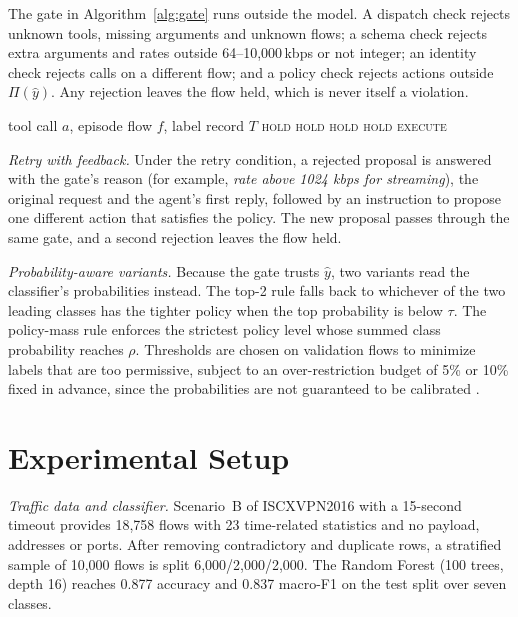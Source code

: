 \documentclass[11pt,a4paper]{article}
\begin{document}
The gate in Algorithm~\ref{alg:gate} runs outside the model. A dispatch check rejects unknown tools, missing arguments and unknown flows; a schema check rejects extra arguments and rates outside 64--10,000\,kbps or not integer; an identity check rejects calls on a different flow; and a policy check rejects actions outside $\Pi(\hat{y})$. Any rejection leaves the flow held, which is never itself a violation.

\begin{algorithm}[t]
\caption{Pre-execution gate}
\label{alg:gate}
\footnotesize
\begin{algorithmic}[1]
\Require tool call $a$, episode flow $f$, label record $T$
  \State \Return \textsc{hold}
\EndIf
{}
  \State \Return \textsc{hold}
\EndIf
{} \State \Return \textsc{hold} \EndIf
{} \State \Return \textsc{hold} \EndIf
\State \Return \textsc{execute}
\end{algorithmic}
\end{algorithm}

\textit{Retry with feedback.} Under the retry condition, a rejected proposal is answered with the gate's reason (for example, \emph{rate above 1024 kbps for streaming}), the original request and the agent's first reply, followed by an instruction to propose one different action that satisfies the policy. The new proposal passes through the same gate, and a second rejection leaves the flow held.

\textit{Probability-aware variants.} Because the gate trusts $\hat{y}$, two variants read the classifier's probabilities instead. The top-2 rule falls back to whichever of the two leading classes has the tighter policy when the top probability is below $\tau$. The policy-mass rule enforces the strictest policy level whose summed class probability reaches $\rho$. Thresholds are chosen on validation flows to minimize labels that are too permissive, subject to an over-restriction budget of 5\% or 10\% fixed in advance, since the probabilities are not guaranteed to be calibrated \cite{guo2017calibration}.

\section{Experimental Setup}

\textit{Traffic data and classifier.} Scenario~B of ISCXVPN2016 with a 15-second timeout provides 18,758 flows with 23 time-related statistics and no payload, addresses or ports. After removing contradictory and duplicate rows, a stratified sample of 10,000 flows is split 6,000/2,000/2,000. The Random Forest (100 trees, depth 16) reaches 0.877 accuracy and 0.837 macro-F1 on the test split over seven classes.
\end{document}
